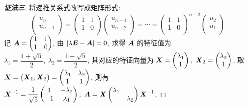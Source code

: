 \begin{proof}[{\songti \textbf{证法三}}]
    将递推关系式改写成矩阵形式:
    $$\begin{pmatrix} u_n \\ u_{n-1} \\\end{pmatrix}=\begin{pmatrix} 1 & 1 \\ 1 & 0 \\\end{pmatrix}\begin{pmatrix} u_{n-1} \\ u_{n-2} \\\end{pmatrix}=\cdots=\begin{pmatrix} 1 & 1 \\ 1 & 0 \\\end{pmatrix}^{n-2}\begin{pmatrix} u_2 \\ u_1 \\\end{pmatrix}$$
    记 $\vb*{A}=\begin{pmatrix} 1 & 1 \\ 1 & 0 \\\end{pmatrix}$, 由 $\left\vert \lambda\vb*{E}-\vb*{A} \right\vert =0$, 求得 $\vb*{A}$ 的特征值为 $\lambda_1=\dfrac{1+\sqrt{5}}{2},~\lambda_2=\dfrac{1-\sqrt{5}}{2}$, 其对应的特征向量为 $\vb*{X}=\begin{pmatrix} \lambda_1 \\ 1 \\\end{pmatrix},~\vb*{X}_2=\begin{pmatrix} \lambda_2 \\ 1 \\\end{pmatrix}$, 取 $\vb*{X}=\mqty(\vb*{X}_1,\vb*{X}_2)=\begin{pmatrix} \lambda_1 & \lambda_2 \\ 1 & 1 \\\end{pmatrix}$, 则有 $\vb*{X}^{-1}=\dfrac{1}{\sqrt{5}}\begin{pmatrix} 1 & -\lambda_2 \\ -1 & \lambda_1 \\\end{pmatrix},~\vb*{A}=\vb*{X}\begin{pmatrix} \lambda_1 &  \\  & \lambda_2 \\\end{pmatrix}\vb*{X}^{-1}$,

\end{proof}
